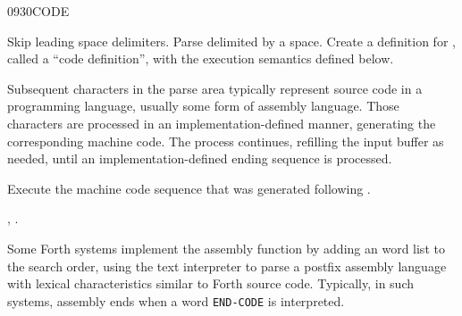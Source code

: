 \pagebreak
\begin{worddef}{0930}{CODE}
\item {}

	Skip leading space delimiters. Parse  delimited by a
	space. Create a definition for , called a ``code
	definition'', with the execution semantics defined below.

	Subsequent characters in the parse area typically represent
	source code in a programming language, usually some form of
	assembly language. Those characters are processed in an
	implementation-defined manner, generating the corresponding
	machine code. The process continues, refilling the input buffer
	as needed, until an implementation-defined ending sequence is
	processed.

\execute[name]

	Execute the machine code sequence that was generated following
	.

\see {},
	.

	\begin{rationale} %
		Some Forth systems implement the assembly function by adding
		an  word list to the search order,
		using the text interpreter to parse a postfix assembly
		language with lexical characteristics similar to Forth source
		code. Typically, in such systems, assembly ends when a word
		\texttt{END-CODE} is interpreted.
	\end{rationale}
\end{worddef}


